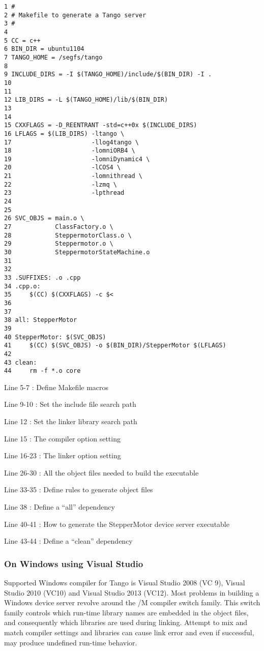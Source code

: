 \begin{verbatim}
1 #
2 # Makefile to generate a Tango server
3 #
4 
5 CC = c++
6 BIN_DIR = ubuntu1104
7 TANGO_HOME = /segfs/tango
8 
9 INCLUDE_DIRS = -I $(TANGO_HOME)/include/$(BIN_DIR) -I .
10
11 
12 LIB_DIRS = -L $(TANGO_HOME)/lib/$(BIN_DIR)
13 
14 
15 CXXFLAGS = -D_REENTRANT -std=c++0x $(INCLUDE_DIRS)
16 LFLAGS = $(LIB_DIRS) -ltango \
17                      -llog4tango \
18                      -lomniORB4 \
19                      -lomniDynamic4 \
20                      -lCOS4 \
21                      -lomnithread \
22                      -lzmq \
23                      -lpthread
24 
25 
26 SVC_OBJS = main.o \
27            ClassFactory.o \
28            SteppermotorClass.o \
29            Steppermotor.o \
30            SteppermotorStateMachine.o
31 
32 
33 .SUFFIXES: .o .cpp
34 .cpp.o:
35     $(CC) $(CXXFLAGS) -c $<
36 
37 
38 all: StepperMotor
39 
40 StepperMotor: $(SVC_OBJS)
41     $(CC) $(SVC_OBJS) -o $(BIN_DIR)/StepperMotor $(LFLAGS)
42 
43 clean:
44     rm -f *.o core
\end{verbatim}




Line 5-7 : Define Makefile macros

Line 9-10 : Set the include file search path

Line 12 : Set the linker library search path

Line 15 : The compiler option setting

Line 16-23 : The linker option setting

Line 26-30 : All the object files needed to build the executable

Line 33-35 : Define rules to generate object files

Line 38 : Define a ``all'' dependency

Line 40-41 : How to generate the StepperMotor device server executable

Line 43-44 : Define a ``clean'' dependency


\subsubsection{On Windows using Visual Studio}
\label{Compiling NT}

Supported Windows compiler for Tango is Visual Studio
2008 (VC 9), Visual Studio 2010 (VC10) and Visual Studio 2013 (VC12).
Most problems in building a Windows device server revolve around the
/M compiler switch family. This switch family controls which run-time
library names are embedded in the object files, and consequently which
libraries are used during linking. Attempt to mix
and match compiler settings and libraries can cause link error and
even if successful, may produce undefined run-time behavior.


